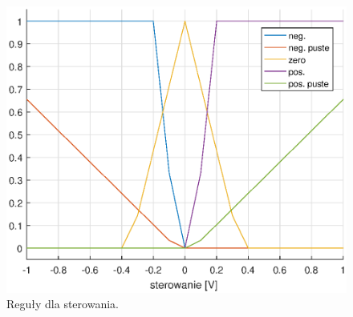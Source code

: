 \begin{figure}[h!]
	\centering
	\includegraphics[scale = 0.8]{fig/u_rules.eps}
	\caption		
	{Reguły dla sterowania.}
	\label{u_rules}
\end{figure}
	
	
	
	
	